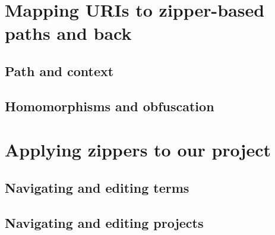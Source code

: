 \section{Mapping URIs to zipper-based paths and back}

\subsection{Path and context}

\subsection{Homomorphisms and obfuscation}

\section{Applying zippers to our project}

\subsection{Navigating and editing terms}

\subsection{Navigating and editing projects}
